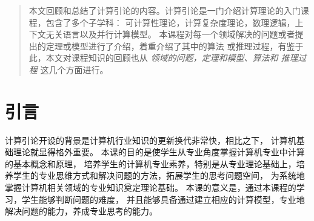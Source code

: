 \begin{abstract}
  本文回顾和总结了计算引论的内容。计算引论是一门介绍计算理论的入门课程，包含了多个子学科：
  可计算性理论，计算复杂度理论，数理逻辑，上下文无关语言以及并行计算模型。
  本课程对每一个领域解决的问题或者提出的定理或模型进行了介绍，着重介绍了其中的算法
  或推理过程，有鉴于此，本文对课程知识的回顾也从 {\itshape 领域的问题，定理和模型、算法和
  推理过程} 这几个方面进行。
\end{abstract}

\chapter{引言}
计算引论开设的背景是计算机行业知识的更新换代非常快，相比之下，
计算机基础理论就显得格外重要。
本课的目的是使学生从专业角度掌握计算机专业中计算的基本概念和原理，
培养学生的计算机专业素养，特别是从专业理论基础上，培养学生的专业思维方式和解决问题的方法，拓展学生的思考问题空间，
为系统地掌握计算机相关领域的专业知识奠定理论基础。
本课的意义是，通过本课程的学习，学生能够判断问题的难度，
并且能够具备通过建立相应的计算模型，专业地解决问题的能力，养成专业思考的能力。
